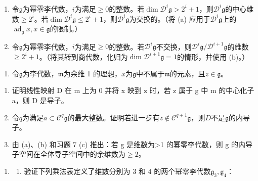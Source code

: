 \begin{enumerate}
\def\labelenumi{(\alph{enumi})}
\setcounter{enumi}{1}
\item
  令\(\mathfrak{g}\)为幂零李代数，\(i\)为满足\(\geqslant 0\)的整数。若\(\dim \mathcal{D}^{i}\mathfrak{g} > 2^{i} + 1\)，则\(\mathcal{D}^{i}\mathfrak{g}\)的中心维数\(\geqslant 2^{i}\)。若\(\dim \mathcal{D}^{i}\mathfrak{g} \leqslant 2^{i} + 1\)，则\(\mathcal{D}^{i}\mathfrak{g}\)为交换的。（将 (a) 应用于\(\mathcal{D}^{i}\mathfrak{g}\)上的\(\operatorname{ad}_{\mathfrak{g}} x, x \in \mathfrak{g}\)的限制。）
\item
  令\(\mathfrak{g}\)为幂零李代数，\(i\)为满足\(\geqslant 0\)的整数。若\(\mathcal{D}^{i}\mathfrak{g}\)不交换，则\(\mathcal{D}^{i}\mathfrak{g}/\mathcal{D}^{i+1}\mathfrak{g}\)的维数\(\geqslant 2^{i} + 1\)。（将其转到商代数，化归为\(\dim \mathcal{D}^{i+1}\mathfrak{g} = 1\)的情形，并使用 (b)。）
\end{enumerate}

\begin{enumerate}
\def\labelenumi{\arabic{enumi}.}
\setcounter{enumi}{7}
\tightlist
\item
  令\(\mathfrak{g}\)为李代数，\(\mathfrak{m}\)为余维 1 的理想，\(x\)为\(\mathfrak{g}\)中不属于\(\mathfrak{m}\)的元素，且\(z \in \mathfrak{g}\)。
\end{enumerate}

\begin{enumerate}
\def\labelenumi{(\alph{enumi})}
\item
  证明线性映射 D 在 m 上为 0 并将 x 映到 z 时，若 z 属于 g 中 m 的中心化子 a，则 D 是导子。
\item
  令\(q\)为满足\(a \subset \mathcal{C}^q\mathfrak{g}\)的最大整数。证明若进一步有\(z \notin \mathcal{C}^{q+1}\mathfrak{g}\)，则\(D\)不是\(\mathfrak{g}\)的内导子。
\item
  由 (a)、(b) 和习题 7 (c) 推出：若 g 是维数为\textgreater1 的幂零李代数，则 g 的内导子空间在全体导子空间中的余维数为\(\geqslant2\)。
\end{enumerate}

\begin{enumerate}
\def\labelenumi{\arabic{enumi}.}
\setcounter{enumi}{8}
\tightlist
\item
  \begin{enumerate}
  \def\labelenumii{(\alph{enumii})}
  \tightlist
  \item
    验证下列乘法表定义了维数分别为 3 和 4 的两个幂零李代数\(\mathfrak{g}_3, \mathfrak{g}_4\)：
  \end{enumerate}
\end{enumerate}

